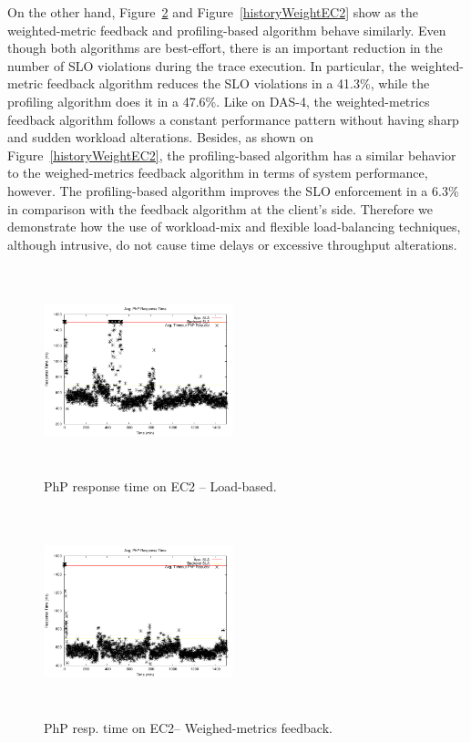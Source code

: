 On the other hand, Figure~\ref{historyEC2} and Figure~\ref{historyWeightEC2} show as the weighted-metric feedback and profiling-based algorithm behave similarly. Even though both algorithms are best-effort, there is an important reduction in the number of SLO violations during the trace execution. In particular, the weighted-metric feedback algorithm reduces the SLO violations in a  41.3\%, while the profiling algorithm does it in a 47.6\%. Like on DAS-4, the weighted-metrics feedback algorithm follows a constant performance pattern without having sharp and sudden workload alterations. Besides, as shown on Figure~\ref{historyWeightEC2}, the profiling-based algorithm has a similar behavior to the weighed-metrics feedback algorithm in terms of system performance, however. The profiling-based algorithm improves the SLO enforcement in a 6.3\% in comparison with the feedback algorithm at the client's side. Therefore we demonstrate how the use of workload-mix and flexible load-balancing techniques, although intrusive, do not cause time delays or excessive throughput alterations. 



\begin{figure}
\begin{center}
\includegraphics[width=0.49\textwidth, height=6cm]{./images/heterogeneous/avgTimeout_PhP_naive}
\end{center}
\caption{PhP  response time on EC2 -- Load-based.}
\label{naiveEC2}
\end{figure}


\begin{figure}
\begin{center}
\includegraphics[width=0.49\textwidth, height=6cm]{./images/heterogeneous/avgTimeout_PhP_history}
\end{center}
\caption{PhP resp. time on EC2-- Weighed-metrics feedback.}
\label{historyEC2}
\end{figure}

